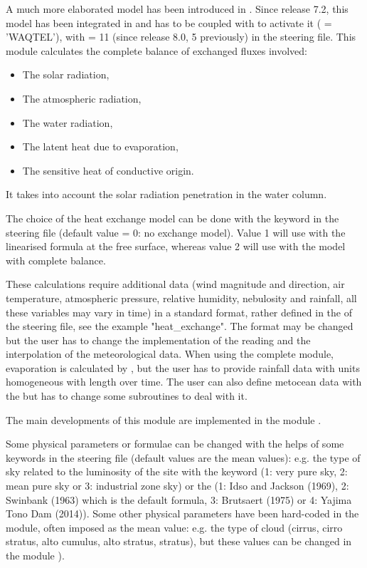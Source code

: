 A much more elaborated model has been introduced in .
Since release 7.2, this model has been integrated in \waqtel and
 has to be coupled with \waqtel to activate it
( = 'WAQTEL'), with
 = 11 (since release 8.0, 5 previously)
in the \waqtel steering file.
This module calculates the complete balance of exchanged fluxes involved:

\begin{itemize}
\item  The solar radiation,

\item  The atmospheric radiation,

\item  The water radiation,

\item  The latent heat due to evaporation,

\item  The sensitive heat of conductive origin.
\end{itemize}

It takes into account the solar radiation penetration in the water column.

The choice of the heat exchange model can be done with the keyword
 in the \waqtel steering file
(default value = 0: no exchange
model). Value 1 will use with the linearised formula at the free surface,
whereas value 2 will use with the model with complete balance.

These calculations require additional data (wind magnitude and direction, air
temperature, atmospheric pressure, relative humidity, nebulosity and rainfall,
all these variables may vary in time) in a standard format, rather defined
in the  of the  steering file,
see the example "heat\_exchange".
The format may be changed but the user has to change the
implementation of the reading and the interpolation of the meteorological data.
When using the complete module, evaporation is calculated by , but
the user has to provide rainfall data with units homogeneous with length over
time.
The user can also define metocean data with the
 but has to change some subroutines
to deal with it.

The main developments of this module are implemented in the module
.

Some physical parameters or formulae can be changed with the helps of some
keywords in the \waqtel steering file (default values are the mean values): e.g.
the type of sky related to the luminosity of the site with the \waqtel keyword
 (1: very pure sky, 2: mean pure sky or 3:
industrial zone sky) or the 
(1: Idso and Jackson (1969), 2: Swinbank (1963) which is the default formula,
3: Brutsaert (1975) or 4: Yajima Tono Dam (2014)).
Some other physical parameters have been hard-coded in the module, often
imposed as the mean value: e.g. the type of cloud (cirrus,
cirro stratus, alto cumulus, alto stratus, stratus), but these values can be
changed in the module ).

